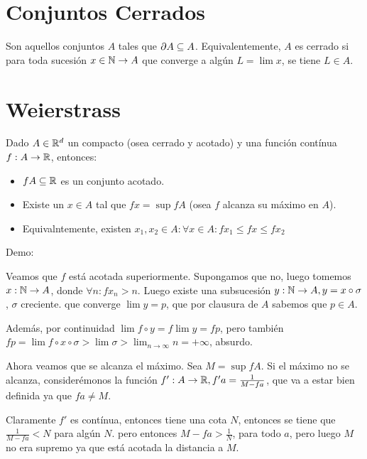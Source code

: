 \documentclass{article}
\begin{document}
	\section{Conjuntos Cerrados}
	Son aquellos conjuntos $A$ tales que $\partial A \subseteq A$. Equivalentemente,
	$A$ es cerrado si para toda sucesión $x \in \mathbb{N} \to A$ que converge a
	algún $L = \lim x$, se tiene $L \in A$.

	\section{Weierstrass}
	Dado $A \in \mathbb{R}^d$ un compacto (osea cerrado y acotado) y una función contínua
	$f : A \to \mathbb{R}$, entonces:
	\begin{itemize}
		\item $f A \subseteq \mathbb{R}$ es un conjunto acotado.
		\item Existe un $x \in A$ tal que $fx = \sup f A$ (osea $f$
		alcanza su máximo en $A$).
		\item Equivalntemente, existen $x_1, x_2 \in
		A : \forall x \in A : fx_1 \leq fx \leq fx_2$
	\end{itemize}

	Demo:

	Veamos que $f$ está acotada superiormente. Supongamos que no, luego tomemos
	$x : \mathbb{N} \to A$, donde $\forall n: fx_n > n$. Luego existe una subsucesión
	$y : \mathbb{N} \to A, y = x \circ \sigma$, $\sigma$ creciente.
	que converge $\lim y = p$, que por clausura de $A$ sabemos
	que $p \in A$.

	Además, por continuidad $\lim f \circ y = f \lim y = fp$,
	pero también $fp = \lim f \circ x \circ \sigma > \lim \sigma >
	\lim_{n \to \infty} n = +\infty$, absurdo.

	Ahora veamos que se alcanza el máximo. Sea $M = \sup f A$. Si el
	máximo no se alcanza,
	considerémonos la función $f' : A \to \mathbb{R}, f' a = \frac{1}{M - fa}$, que
	va a estar bien definida ya que $fa \neq M$.

	Claramente $f'$ es contínua, entonces tiene una cota $N$, entonces se
	tiene que $\frac{1}{M - fa} < N$ para algún $N$. pero entonces
	$M - fa > \frac{1}{N}$, para todo $a$, pero luego $M$ no era supremo ya
	que está acotada la distancia a $M$.
\end{document}
